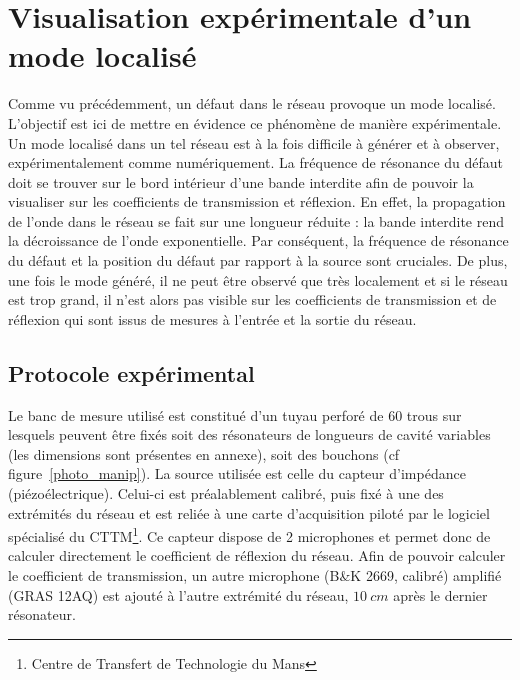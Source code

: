 \chapter{Visualisation expérimentale d'un mode localisé}
Comme vu précédemment, un défaut dans le réseau provoque un mode localisé. L'objectif est ici de mettre en évidence ce phénomène de manière expérimentale.\\


Un mode localisé dans un tel réseau est à la fois difficile à générer et à observer, expérimentalement comme numériquement. La fréquence de résonance du défaut doit se trouver sur le bord intérieur d'une bande interdite afin de pouvoir la visualiser sur les coefficients de transmission et réflexion. En effet, la propagation de l'onde dans le réseau se fait sur une longueur réduite : la bande interdite rend la décroissance de l'onde exponentielle. Par conséquent, la fréquence de résonance du défaut et la position du défaut par rapport à la source sont cruciales. De plus, une fois le mode généré, il ne peut être observé que très localement et si le réseau est trop grand, il n'est alors pas visible sur les coefficients de transmission et de réflexion qui sont issus de mesures à l'entrée et la sortie du réseau.


\section{Protocole expérimental}
Le banc de mesure utilisé est constitué d'un tuyau perforé de 60 trous sur lesquels peuvent être fixés soit des résonateurs de longueurs de cavité variables (les dimensions sont présentes en annexe), soit des bouchons (cf figure~\ref{photo_manip}). La source utilisée est celle du capteur d'impédance (piézoélectrique). Celui-ci est préalablement calibré, puis fixé à une des extrémités du réseau et est reliée à une carte d'acquisition piloté par le logiciel spécialisé du CTTM\footnote{Centre de Transfert de Technologie du Mans}. Ce capteur dispose de 2 microphones et permet donc de calculer directement le coefficient de réflexion du réseau. Afin de pouvoir calculer le coefficient de transmission, un autre microphone (B\&K 2669, calibré) amplifié (GRAS 12AQ) est ajouté à l'autre extrémité du réseau, $10~cm$ après le dernier résonateur.


